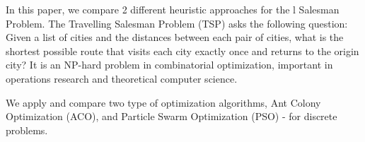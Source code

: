 In this paper, we compare 2 different heuristic approaches for the l Salesman Problem. The Travelling Salesman Problem (TSP) asks the following question: Given a list of cities and the distances between each pair of cities, what is the shortest possible route that visits each city exactly once and returns to the origin city? It is an NP-hard problem in combinatorial optimization, important in operations research and theoretical computer science.

We apply and compare two type of optimization algorithms, Ant Colony Optimization (ACO), and Particle Swarm Optimization (PSO) - for discrete problems.

